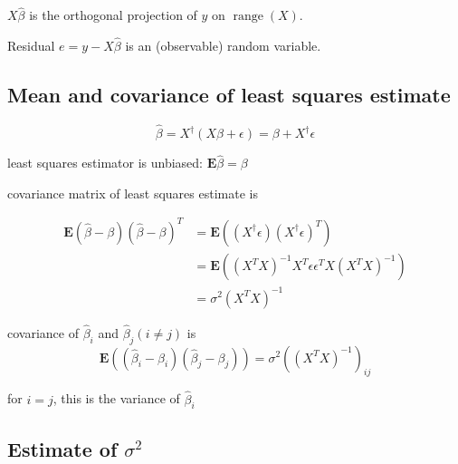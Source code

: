 $ X \hat{\beta} $ is the orthogonal projection of $ y $ on $ \operatorname{range}(X) $.

Residual $ e=y-X \hat{\beta} $ is an (observable) random variable.

\subsection{Mean and covariance of least squares estimate}

\begin{theorem}
    $$
\hat{\beta}=X^{\dagger}(X \beta+\epsilon)=\beta+X^{\dagger} \epsilon
$$
\end{theorem}

\begin{theorem}
    least squares estimator is unbiased: $ \mathbf{E} \hat{\beta}=\beta $
\end{theorem}

\begin{theorem}
    covariance matrix of least squares estimate is

$$
\begin{aligned}
\mathbf{E}(\hat{\beta}-\beta)(\hat{\beta}-\beta)^{T} &=\mathbf{E}\left(\left(X^{\dagger} \epsilon\right)\left(X^{\dagger} \epsilon\right)^{T}\right) \\
&=\mathbf{E}\left(\left(X^{T} X\right)^{-1} X^{T} \epsilon \epsilon^{T} X\left(X^{T} X\right)^{-1}\right) \\
&=\sigma^{2}\left(X^{T} X\right)^{-1}
\end{aligned}
$$
\end{theorem}

\begin{theorem}
    covariance of $ \hat{\beta}_{i} $ and $ \hat{\beta}_{j}(i \neq j) $ is
$$
\mathbf{E}\left(\left(\hat{\beta}_{i}-\beta_{i}\right)\left(\hat{\beta}_{j}-\beta_{j}\right)\right)=\sigma^{2}\left(\left(X^{T} X\right)^{-1}\right)_{i j}
$$
\end{theorem}

\begin{corollary}
    for $ i=j $, this is the variance of $ \hat{\beta}_{i} $
\end{corollary}



\subsection{Estimate of $ \sigma^{2} $}


